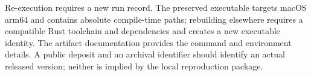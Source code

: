 Re-execution requires a new run record. The preserved executable targets macOS arm64 and contains absolute compile-time paths; rebuilding elsewhere requires a compatible Rust toolchain and dependencies and creates a new executable identity. The artifact documentation provides the command and environment details. A public deposit and an archival identifier should identify an actual released version; neither is implied by the local reproduction package.
